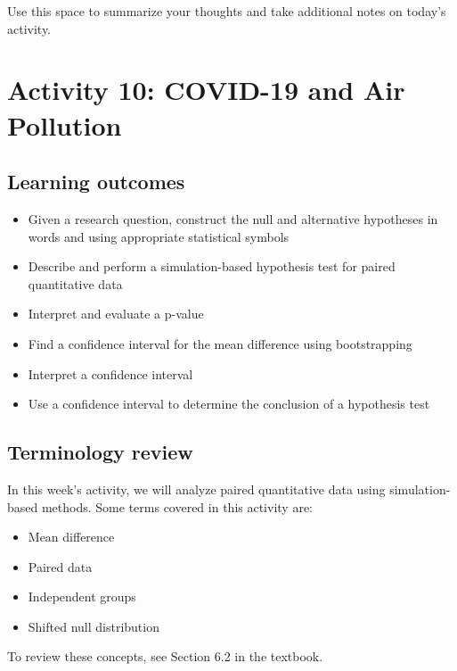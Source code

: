 \documentclass[
]{report}
\begin{document}
Use this space to summarize your thoughts and take additional notes on today's activity.

\hypertarget{activity-10-covid-19-and-air-pollution}{%
\chapter{Activity 10: COVID-19 and Air Pollution}\label{activity-10-covid-19-and-air-pollution}}

\hypertarget{learning-outcomes}{%
\section{Learning outcomes}\label{learning-outcomes}}

\begin{itemize}
\item
  Given a research question, construct the null and alternative hypotheses
  in words and using appropriate statistical symbols
\item
  Describe and perform a simulation-based hypothesis test for paired quantitative data
\item
  Interpret and evaluate a p-value
\item
  Find a confidence interval for the mean difference using bootstrapping
\item
  Interpret a confidence interval
\item
  Use a confidence interval to determine the conclusion of a hypothesis test
\end{itemize}

\hypertarget{terminology-review}{%
\section{Terminology review}\label{terminology-review}}

In this week's activity, we will analyze paired quantitative data using simulation-based methods. Some terms covered in this activity are:

\begin{itemize}
\item
  Mean difference
\item
  Paired data
\item
  Independent groups
\item
  Shifted null distribution
\end{itemize}

To review these concepts, see Section 6.2 in the textbook.
\end{document}
